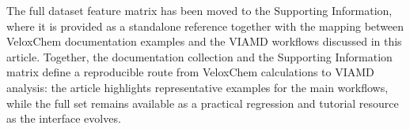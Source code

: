 \documentclass[journal=jacsat,manuscript=article]{achemso}
\begin{document}
The full dataset feature matrix has been moved to the Supporting Information, where it is provided as a standalone reference together with the mapping between VeloxChem documentation examples and the VIAMD workflows discussed in this article. Together, the documentation collection and the Supporting Information matrix define a reproducible route from VeloxChem calculations to VIAMD analysis: the article highlights representative examples for the main workflows, while the full set remains available as a practical regression and tutorial resource as the interface evolves.







\end{document}
